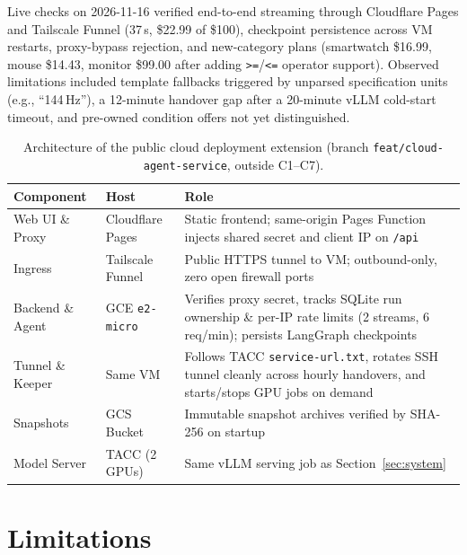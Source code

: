 \documentclass[10pt,letterpaper,twocolumn]{article}
\begin{document}
Live checks on 2026-11-16 verified end-to-end streaming through Cloudflare Pages and Tailscale Funnel (37\,s, \$22.99
of \$100), checkpoint persistence across VM restarts, proxy-bypass rejection, and new-category plans (smartwatch
\$16.99, mouse \$14.43, monitor \$99.00 after adding \texttt{>=}/\texttt{<=} operator support). Observed limitations
included template fallbacks triggered by unparsed specification units (e.g., ``144\,Hz''), a 12-minute handover gap
after a 20-minute vLLM cold-start timeout, and pre-owned condition offers not yet distinguished.

\begin{table}[t]
\centering\small
\caption{Architecture of the public cloud deployment extension (branch \texttt{feat/cloud-agent-service}, outside C1--C7).}\label{tab:cloud}
\renewcommand{\arraystretch}{1.12}
\begin{tabularx}{\textwidth}{@{}l l Y@{}}
\toprule
\textbf{Component} & \textbf{Host} & \textbf{Role} \\
\midrule
Web UI \& Proxy & Cloudflare Pages & Static frontend; same-origin Pages Function injects shared secret and client IP on \texttt{/api} \\
Ingress & Tailscale Funnel & Public HTTPS tunnel to VM; outbound-only, zero open firewall ports \\
Backend \& Agent & GCE \texttt{e2-micro} & Verifies proxy secret, tracks SQLite run ownership \& per-IP rate limits (2 streams, 6 req/min); persists LangGraph checkpoints \\
Tunnel \& Keeper & Same VM & Follows TACC \texttt{service-url.txt}, rotates SSH tunnel cleanly across hourly handovers, and starts/stops GPU jobs on demand \\
Snapshots & GCS Bucket & Immutable snapshot archives verified by SHA-256 on startup \\
Model Server & TACC (2 GPUs) & Same vLLM serving job as Section~\ref{sec:system} \\
\bottomrule
\end{tabularx}
\end{table}

\section{Limitations}\label{sec:limits}
\end{document}

